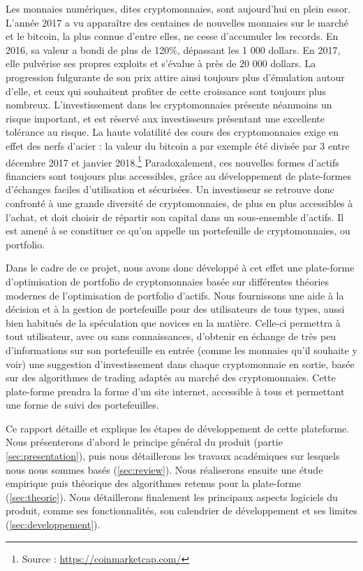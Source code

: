 \documentclass[a4paper, 10pt]{article}
\begin{document}
Les monnaies numériques, dites cryptomonnaies, sont aujourd'hui en plein essor. L'année 2017 a vu apparaître des centaines de nouvelles monnaies sur le marché et le bitcoin, la plus connue d'entre elles, ne cesse d’accumuler les records. En 2016, sa valeur a bondi de plus de 120\%, dépassant les 1 000 dollars. En 2017, elle pulvérise ses propres exploits et s'évalue à près de 20 000 dollars. La progression fulgurante de son prix attire ainsi toujours plus d'émulation autour d'elle, et ceux qui souhaitent profiter de cette croissance sont toujours plus nombreux. L’investissement dans les cryptomonnaies présente néanmoins un risque important, et est réservé aux investisseurs présentant une excellente tolérance au risque. La haute volatilité des cours des cryptomonnaies exige en effet des nerfs d’acier : la valeur du bitcoin a par exemple été divisée par 3 entre décembre 2017 et janvier 2018.\footnote{Source : \url{https://coinmarketcap.com/}} Paradoxalement, ces nouvelles formes d'actifs financiers sont toujours plus accessibles, grâce au développement de plate-formes d'échanges faciles d'utilisation et sécurisées. Un investisseur se retrouve donc confronté à une grande diversité de cryptomonnaies, de plus en plus accessibles à l’achat, et doit choisir de répartir son capital dans un sous-ensemble d’actifs. Il est amené à se constituer ce qu’on appelle un portefeuille de cryptomonnaies, ou portfolio.

Dans le cadre de ce projet, nous avons donc développé à cet effet une plate-forme d’optimisation de portfolio de cryptomonnaies basée sur différentes théories modernes de l'optimisation de portfolio d'actifs. Nous fournissons une aide à la décision et à la gestion de portefeuille pour des utilisateurs de tous types, aussi bien habitués de la spéculation que novices en la matière. Celle-ci permettra à tout utilisateur, avec ou sans connaissances, d'obtenir en échange de très peu d'informations sur son portefeuille en entrée (comme les monnaies qu'il souhaite y voir) une suggestion d’investissement dans chaque cryptomonnaie en sortie, basée sur des algorithmes de trading adaptés au marché des cryptomonnaies. Cette plate-forme prendra la forme d'un site internet, accessible à tous et permettant une forme de suivi des portefeuilles.

Ce rapport détaille et explique les étapes de développement de cette plateforme. Nous présenterons d'abord le principe général du produit (partie \ref{sec:presentation}), puis nous détaillerons les travaux académiques sur lesquels nous nous sommes basés (\ref{sec:review}). Nous réaliserons ensuite une étude empirique puis théorique des algorithmes retenus pour la plate-forme (\ref{sec:theorie}). Nous détaillerons finalement les principaux aspects logiciels du produit, comme ses fonctionnalités, son calendrier de développement et ses limites (\ref{sec:developpement}).
\end{document}
